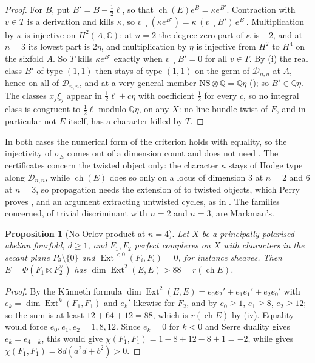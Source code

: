 \documentclass[11pt,reqno]{amsart}
\theoremstyle{plain}
\newtheorem{proposition}[theorem]{Proposition}
\theoremstyle{definition}
\theoremstyle{remark}
\newcommand{\QQ}{\mathbb{Q}}
\newcommand{\CC}{\mathbb{C}}
\newcommand{\cD}{\mathcal{D}}
\newcommand{\NS}{\mathrm{NS}}
\DeclareMathOperator{\ch}{ch}
\DeclareMathOperator{\Ext}{Ext}
\begin{document}
\begin{proof}
For $B$, put $B'=B-\frac12\ell$, so that $\ch(E)e^{B}=\kappa e^{B'}$.
Contraction with $v\in T$ is a derivation and kills $\kappa$, so
$v\lrcorner(\kappa e^{B'})=\kappa\,(v\lrcorner B')\,e^{B'}$. Multiplication by
$\kappa$ is injective on $H^{2}(A,\CC)$: at $n=2$ the degree zero part of
$\kappa$ is $-2$, and at $n=3$ its lowest part is $2\eta$, and multiplication
by $\eta$ is injective from $H^{2}$ to $H^{4}$ on the sixfold $A$. So $T$ kills
$\kappa e^{B'}$ exactly when $v\lrcorner B'=0$ for all $v\in T$. By
(i) the real class $B'$ of type $(1,1)$ then stays of
type $(1,1)$ on the germ of $\cD_{n,n}$ at $A$, hence on all of $\cD_{n,n}$, and
at a very general member $\NS\otimes\QQ=\QQ\eta$ (\cite[Lemma~7.5]{paperI}); so
$B'\in\QQ\eta$. The classes $x_{j}\xi_{j}$ appear in $\frac12\ell+c\eta$ with
coefficient $\frac12$ for every $c$, so no integral class is congruent to
$\frac12\ell$ modulo $\QQ\eta$, on any $X$: no line bundle twist of $E$, and in
particular not $E$ itself, has a character killed by $T$.
\end{proof}

In both cases the numerical form of the criterion holds with equality, so the
injectivity of $\sigma_{E}$ comes out of a dimension count and does not need
\cite[Question 11.4]{Mar25b}. The certificates concern the twisted object
only: the character $\kappa$ stays of Hodge type along $\cD_{n,n}$, while
$\ch(E)$ does
so only on a locus of dimension $3$ at $n=2$ and $6$ at $n=3$, so propagation
needs the extension of  to twisted objects, which Perry proves
\cite{Per26}, and an argument extracting untwisted cycles, as in
\cite[Section 2]{Mar25b}. The families concerned, of trivial discriminant with
$n=2$ and $n=3$, are Markman's.

\begin{proposition}[No Orlov product at $n=4$]\label{prop:orlovfour}
Let $X$ be a principally polarised abelian fourfold, $d\ge1$, and
$F_{1},F_{2}$ perfect complexes on $X$ with characters in the secant plane
$P_{\theta}\setminus\{0\}$ and $\Ext^{<0}(F_{i},F_{i})=0$, for instance
sheaves. Then $E=\Phi(F_{1}\boxtimes F_{2}^{\vee})$ has
$\dim\Ext^{2}(E,E)>88=r(\ch E)$.
\end{proposition}

\begin{proof}
By the K\"unneth formula $\dim\Ext^{2}(E,E)=e_{0}e_{2}'+e_{1}e_{1}'+e_{2}e_{0}'$
with $e_{k}=\dim\Ext^{k}(F_{1},F_{1})$ and $e_{k}'$ likewise for $F_{2}$, and by
 $e_{0}\ge1$, $e_{1}\ge8$, $e_{2}\ge12$; so the sum is
at least $12+64+12=88$, which is $r(\ch E)$ by (iv). Equality
would force $e_{0},e_{1},e_{2}=1,8,12$. Since $e_{k}=0$ for $k<0$ and Serre
duality gives $e_{k}=e_{4-k}$, this would give
$\chi(F_{1},F_{1})=1-8+12-8+1=-2$, while  gives
$\chi(F_{1},F_{1})=8d(a^{2}d+b^{2})>0$.
\end{proof}
\end{document}
